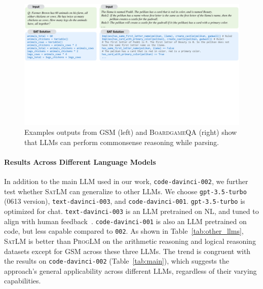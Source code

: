 \documentclass{article}
\theoremstyle{definition}
\newcommand\ttsmall[1]{\texttt{\small #1}}
\newcommand{\gsm}{\textsc{GSM}}
\newcommand{\boardgame}{\textsc{BoardgameQA}}
\newcommand{\satlm}{\textsc{SatLM}}
\newcommand{\pallm}{\textsc{ProgLM}}
\begin{document}


\begin{figure}[t]
  \begin{center}
    \includegraphics[width=0.9\linewidth,trim=0 585 0 0,clip]{figures/qualitative.pdf}
  \end{center}
    \vspace{-0.5em}
  \caption{Examples outputs from \gsm{} (left) and \boardgame{} (right) show that LLMs can perform commonsense reasoning while parsing.}
  \label{fig:exs_qualitative}
\end{figure}


\paragraph{Results Across Different Language Models}
In addition to the main LLM used in our work, \ttsmall{code-davinci-002}, we further test whether \satlm{} can generalize to other LLMs. We choose \ttsmall{gpt-3.5-turbo} (0613 version), \ttsmall{text-davinci-003}, and \ttsmall{code-davinci-001}. \ttsmall{gpt-3.5-turbo} is optimized for chat. \ttsmall{text-davinci-003} is an LLM pretrained on NL, and tuned to align with human feedback~\citep{instructgpt}. \ttsmall{code-davinci-001} is also an LLM pretrained on code, but less capable compared to \ttsmall{002}. As shown in Table~\ref{tab:other_llms}, \satlm{} is better than \pallm{} on the arithmetic reasoning and logical reasoning datasets except for \gsm{} across these three LLMs. The trend is congruent with the results on \ttsmall{code-davinci-002} (Table~\ref{tab:main}), which suggests the approach's general applicability across different LLMs, regardless of their varying capabilities.
\end{document}
